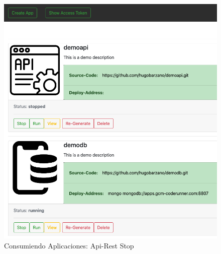 \documentclass[a4paper,11pt]{book}
\begin{document}
\begin{figure}[H]
\centering
\includegraphics[scale=0.4]{imagenes/casouso_a/1_3.png}
\caption{  Consumiendo Aplicaciones: Api-Rest  Stop}
\label{1_3}
\end{figure}
\end{document}
